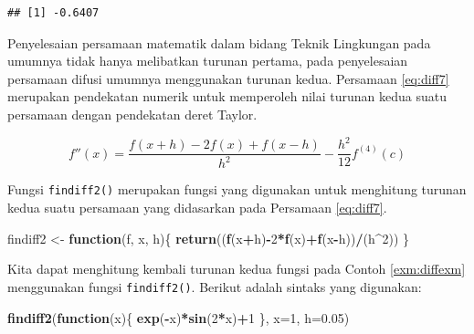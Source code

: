 \documentclass[
]{book}
\newenvironment{Shaded}{\begin{snugshade}}{\end{snugshade}}
\newcommand{\AttributeTok}[1]{\textcolor[rgb]{0.13,0.29,0.53}{#1}}
\newcommand{\ControlFlowTok}[1]{\textcolor[rgb]{0.13,0.29,0.53}{\textbf{#1}}}
\newcommand{\DecValTok}[1]{\textcolor[rgb]{0.00,0.00,0.81}{#1}}
\newcommand{\FloatTok}[1]{\textcolor[rgb]{0.00,0.00,0.81}{#1}}
\newcommand{\FunctionTok}[1]{\textcolor[rgb]{0.13,0.29,0.53}{\textbf{#1}}}
\newcommand{\NormalTok}[1]{#1}
\newcommand{\OtherTok}[1]{\textcolor[rgb]{0.56,0.35,0.01}{#1}}
\newcommand{\SpecialCharTok}[1]{\textcolor[rgb]{0.81,0.36,0.00}{\textbf{#1}}}
\theoremstyle{definition}
\theoremstyle{definition}
\theoremstyle{definition}
\theoremstyle{definition}
\theoremstyle{remark}
\begin{document}
\begin{verbatim}
## [1] -0.6407
\end{verbatim}

Penyelesaian persamaan matematik dalam bidang Teknik Lingkungan pada umumnya tidak hanya melibatkan turunan pertama, pada penyelesaian persamaan difusi umumnya menggunakan turunan kedua. Persamaan \eqref{eq:diff7} merupakan pendekatan numerik untuk memperoleh nilai turunan kedua suatu persamaan dengan pendekatan deret Taylor.

\begin{equation}
f''\left(x\right)=\frac{f\left(x+h\right)-2f\left(x\right)+f\left(x-h\right)}{h^2}-\frac{h^2}{12}f^{\left(4\right)}\left(c\right)
  \label{eq:diff7}
\end{equation}

Fungsi \texttt{findiff2()} merupakan fungsi yang digunakan untuk menghitung turunan kedua suatu persamaan yang didasarkan pada Persamaan \eqref{eq:diff7}.

\begin{Shaded}
\begin{Highlighting}[]
\NormalTok{findiff2 }\OtherTok{\textless{}{-}} \ControlFlowTok{function}\NormalTok{(f, x, h)\{}
  \FunctionTok{return}\NormalTok{((}\FunctionTok{f}\NormalTok{(x}\SpecialCharTok{+}\NormalTok{h)}\SpecialCharTok{{-}}\DecValTok{2}\SpecialCharTok{*}\FunctionTok{f}\NormalTok{(x)}\SpecialCharTok{+}\FunctionTok{f}\NormalTok{(x}\SpecialCharTok{{-}}\NormalTok{h))}\SpecialCharTok{/}\NormalTok{(h}\SpecialCharTok{\^{}}\DecValTok{2}\NormalTok{))}
\NormalTok{\}}
\end{Highlighting}
\end{Shaded}

Kita dapat menghitung kembali turunan kedua fungsi pada Contoh \ref{exm:diffexm} menggunakan fungsi \texttt{findiff2()}. Berikut adalah sintaks yang digunakan:

\begin{Shaded}
\begin{Highlighting}[]
\FunctionTok{findiff2}\NormalTok{(}\ControlFlowTok{function}\NormalTok{(x)\{}
  \FunctionTok{exp}\NormalTok{(}\SpecialCharTok{{-}}\NormalTok{x)}\SpecialCharTok{*}\FunctionTok{sin}\NormalTok{(}\DecValTok{2}\SpecialCharTok{*}\NormalTok{x)}\SpecialCharTok{+}\DecValTok{1}
\NormalTok{\}, }\AttributeTok{x=}\DecValTok{1}\NormalTok{, }\AttributeTok{h=}\FloatTok{0.05}\NormalTok{)}
\end{Highlighting}
\end{Shaded}
\end{document}
